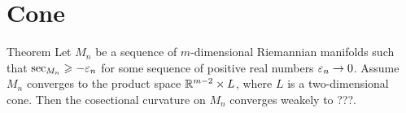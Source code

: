 \section{Cone}

\begin{thm}{Theorem}
Let $M_n$ be a sequence of $m$-dimensional Riemannian manifolds such that 
$\sec_{M_n}\geqslant -\varepsilon_n$ for some sequence of positive real numbers $\eps_n\zz\to 0$.
Assume $M_n$ converges to the product space $\mathbb{R}^{m-2}\times L$, where $L$ is a two-dimensional cone.
Then the cosectional curvature on $M_n$ converges weakely to ???.
\end{thm}
